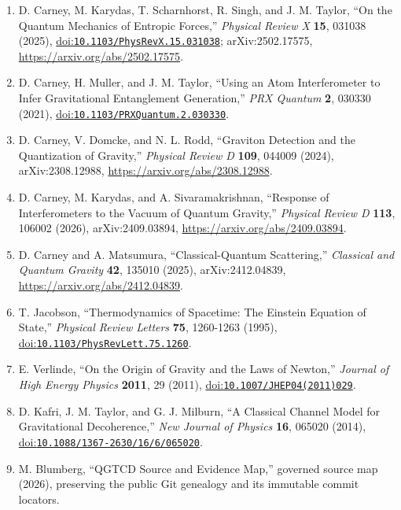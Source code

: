 \documentclass[
  american,
  11pt,
  letterpaper,
]{article}
\providecommand{\tightlist}{%
  \setlength{\itemsep}{0pt}\setlength{\parskip}{0pt}}
\begin{document}
\begin{enumerate}
\def\labelenumi{\arabic{enumi}.}
\tightlist
\item
  D. Carney, M. Karydas, T. Scharnhorst, R. Singh, and J. M. Taylor, ``On the Quantum Mechanics of Entropic Forces,'' \emph{Physical Review X} \textbf{15}, 031038 (2025), \href{https://doi.org/10.1103/PhysRevX.15.031038}{doi:\nolinkurl{10.1103/PhysRevX.15.031038}}; arXiv:2502.17575, \url{https://arxiv.org/abs/2502.17575}.
\item
  D. Carney, H. Muller, and J. M. Taylor, ``Using an Atom Interferometer to Infer Gravitational Entanglement Generation,'' \emph{PRX Quantum} \textbf{2}, 030330 (2021), \href{https://doi.org/10.1103/PRXQuantum.2.030330}{doi:\nolinkurl{10.1103/PRXQuantum.2.030330}}.
\item
  D. Carney, V. Domcke, and N. L. Rodd, ``Graviton Detection and the Quantization of Gravity,'' \emph{Physical Review D} \textbf{109}, 044009 (2024), arXiv:2308.12988, \url{https://arxiv.org/abs/2308.12988}.
\item
  D. Carney, M. Karydas, and A. Sivaramakrishnan, ``Response of Interferometers to the Vacuum of Quantum Gravity,'' \emph{Physical Review D} \textbf{113}, 106002 (2026), arXiv:2409.03894, \url{https://arxiv.org/abs/2409.03894}.
\item
  D. Carney and A. Matsumura, ``Classical-Quantum Scattering,'' \emph{Classical and Quantum Gravity} \textbf{42}, 135010 (2025), arXiv:2412.04839, \url{https://arxiv.org/abs/2412.04839}.
\item
  T. Jacobson, ``Thermodynamics of Spacetime: The Einstein Equation of State,'' \emph{Physical Review Letters} \textbf{75}, 1260-1263 (1995), \href{https://doi.org/10.1103/PhysRevLett.75.1260}{doi:\nolinkurl{10.1103/PhysRevLett.75.1260}}.
\item
  E. Verlinde, ``On the Origin of Gravity and the Laws of Newton,'' \emph{Journal of High Energy Physics} \textbf{2011}, 29 (2011), \href{https://doi.org/10.1007/JHEP04(2011)029}{doi:\nolinkurl{10.1007/JHEP04(2011)029}}.
\item
  D. Kafri, J. M. Taylor, and G. J. Milburn, ``A Classical Channel Model for Gravitational Decoherence,'' \emph{New Journal of Physics} \textbf{16}, 065020 (2014), \href{https://doi.org/10.1088/1367-2630/16/6/065020}{doi:\nolinkurl{10.1088/1367-2630/16/6/065020}}.
\item
  M. Blumberg, ``QGTCD Source and Evidence Map,'' governed source map (2026), preserving the public Git genealogy and its immutable commit locators.

\end{enumerate}
\end{document}
